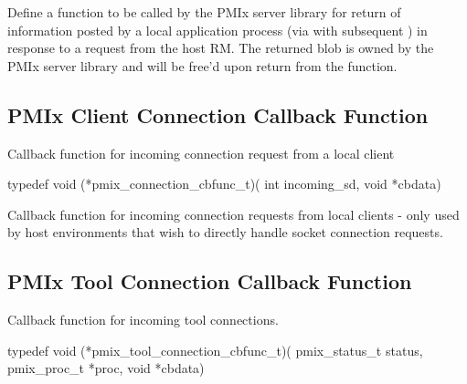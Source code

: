 \descr
Define a function to be called by the PMIx server library for return of information posted by a local application process (via  with subsequent ) in response to a request from the host RM. The returned  blob is owned by the PMIx server library and will be free’d upon return from the function.

\subsection{PMIx Client Connection Callback Function}

\summary

Callback function for incoming connection request from a local client

\format

\cspecificstart
\begin{codepar}
typedef void (*pmix_connection_cbfunc_t)(
                             int incoming_sd, void *cbdata)
\end{codepar}
\cspecificend

\begin{arglist}
\end{arglist}

\descr

Callback function for incoming connection requests from local clients - only used by host environments that wish to directly handle socket connection requests.


\subsection{PMIx Tool Connection Callback Function}

\summary

Callback function for incoming tool connections.

\format

\cspecificstart
\begin{codepar}
typedef void (*pmix_tool_connection_cbfunc_t)(
                             pmix_status_t status,
                             pmix_proc_t *proc, void *cbdata)
\end{codepar}
\cspecificend

\begin{arglist}
\end{arglist}

